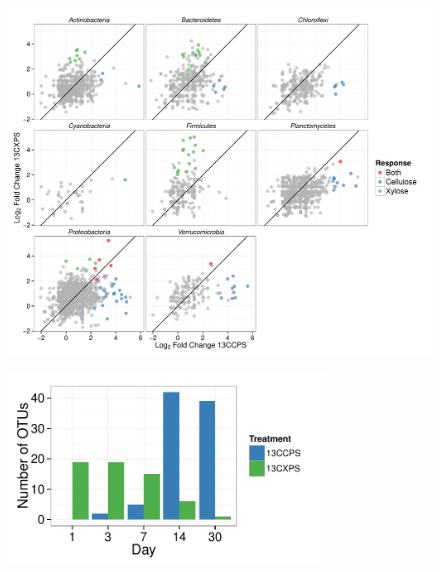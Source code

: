 \begin{figure}[H]
	\begin{center}
    \centerline{\includegraphics[width=11.4cm]{figures/generalist_specialist/generalist_specialist.pdf}}
    \caption{\protect}\label{fig:genspec}
    \end{center} 
\end{figure}

\begin{figure}[H]
	\begin{center}
	\centerline{\includegraphics[width=0.75\textwidth]{figures/all_rspndr_bar/all_rspndr_bar.pdf}}
	\caption[Counts of $^{13}$C-responders at each day]{\protect}\label{fig:rspndr_count}
        \end{center}
\end{figure}


